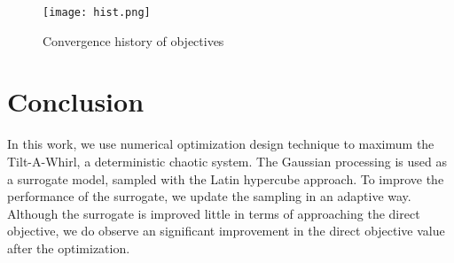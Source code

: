 \documentclass[a4paper]{article}
\begin{document}
\begin{figure} [H]
    \centering
    \texttt{[image: hist.png]}
  \caption{Convergence history of objectives}  
  \label{fig:con_hist}
\end{figure}

\section{Conclusion}
In this work, we use numerical optimization design technique to maximum the Tilt-A-Whirl, a deterministic chaotic system. The Gaussian processing is used as a surrogate model, sampled with the Latin hypercube approach. To improve the performance of the surrogate, we update the sampling in an adaptive way. Although the surrogate is improved little in terms of approaching the direct objective, we do observe an significant improvement in the direct objective value after the optimization.



\end{document}
